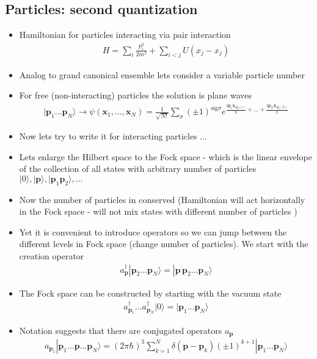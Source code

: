 \documentclass[10pt,a4paper]{book}
\theoremstyle{definition}
\begin{document}
\subsection{Particles: second quantization}
\begin{itemize}
\item Hamiltonian for particles interacting via pair interaction
\begin{align}
H=\sum_i\frac{p_i^2}{2m^2}+\sum_{i<j}U(x_j-x_j)
\end{align}
\item Analog to grand canonical ensemble lets consider a variable particle number
\item For free (non-interacting) particles the solution is plane waves
\begin{align}
|\mathbf{p}_1...\mathbf{p}_N\rangle\rightarrow\psi(\mathbf{x}_1,...,\mathbf{x}_N)=\frac{1}{\sqrt{N!}}\sum_\sigma(\pm1)^{\text{sig}\sigma}e^{\frac{i\mathbf{p}_1\mathbf{x}_{\text{sig}(1)}}{\pi}+...+\frac{i\mathbf{p}_N\mathbf{x}_{\text{sig}(N)}}{\pi}}
\end{align}
\item Now lets try to write it for interacting particles ...
\item Lets enlarge the Hilbert space to the Fock space - which is the linear envelope of the collection of all states with arbitrary number of particles $|0\rangle, |\mathbf{p}\rangle, |\mathbf{p}_1\mathbf{p}_2\rangle,...$
\item Now the number of particles in conserved (Hamiltonian will act horizontally in the Fock space - will not mix states with different number of particles )
\item Yet it is convenient to introduce operators so we can jump between the different levels in Fock space (change number of particles). We start with the creation operator
\begin{align}
a^\dagger_\mathbf{p}|\mathbf{p}_2...\mathbf{p}_N\rangle=|\mathbf{p}\,\mathbf{p}_2...\mathbf{p}_N\rangle
\end{align}
\item The Fock space can be constructed by starting with the vacuum state
\begin{align}
a^\dagger_{\mathbf{p}_1}...a^\dagger_{\mathbf{p}_N}|0\rangle=|\mathbf{p}_1...\mathbf{p}_N\rangle
\end{align}
\item Notation suggests that there are conjugated operators $a_\mathbf{p}$
\begin{align}
a_{\mathbf{p}_1}|\mathbf{p}_1...\mathbf{p}...\mathbf{p}_N\rangle
=(2\pi\hbar)^3\sum_{k=1}^N\delta(\mathbf{p}-\mathbf{p}_k)(\pm1)^{k+1}|\mathbf{p}_1...\mathbf{p}_N\rangle
\end{align}




\end{itemize}
\end{document}
